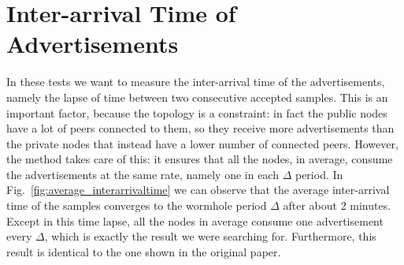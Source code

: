 \newpage
\section{Inter-arrival Time of Advertisements}
\label{sec:interarrivaltime}
In these tests we want to measure the inter-arrival time of the advertisements, namely the lapse of time between two consecutive accepted samples. This is an important factor, because the topology is a constraint: in fact the public nodes have a lot of peers connected to them, so they receive more advertisements than the private nodes that instead have a lower number of connected peers. However, the \acceptAd method takes care of this: it ensures that all the nodes, in average, consume the advertisements at the same rate, namely one in each $\Delta$ period. In Fig.~\ref{fig:average_interarrivaltime} we can observe that the average inter-arrival time of the samples converges to the wormhole period $\Delta$ after about 2 minutes. Except in this time lapse, all the nodes in average consume one advertisement every $\Delta$, which is exactly the result we were searching for. Furthermore, this result is identical to the one shown in the original paper.

